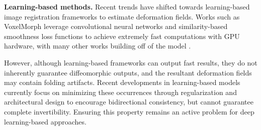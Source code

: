 \textbf{Learning-based methods.}
Recent trends have shifted towards learning-based image registration frameworks to estimate deformation fields. Works such as VoxelMorph \cite{VoxelMorph2019} leverage convolutional neural networks and similarity-based smoothness loss functions to achieve extremely fast computations with GPU hardware, with many other works building off of the model \cite{Hoopes2021HyperMorph, hoffmann2022synthmorph, CHEN2022102615}.

However, although learning-based frameworks can output fast results, they do not inherently guarantee diffeomorphic outputs, and the resultant deformation fields may contain folding artifacts. Recent developments in learning-based models currently focus on minimizing these occurrences through regularization and architectural design \cite{Dalca2018, KIM2021CycleMorph, Huang2023} to encourage bidirectional consistency, but cannot guarantee complete invertibility. Ensuring this property remains an active problem for deep learning-based approaches.

